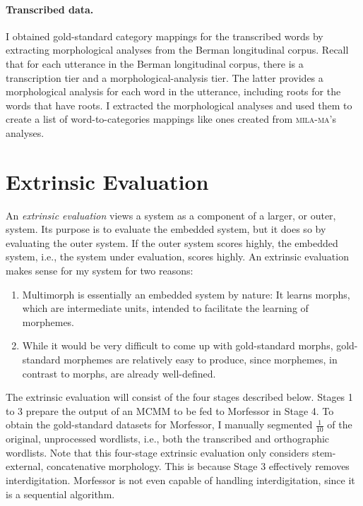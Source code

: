 \paragraph{Transcribed data.} I obtained gold-standard category mappings for the 
transcribed words by extracting morphological analyses from the Berman 
longitudinal corpus. Recall that for each utterance in the Berman longitudinal corpus, 
there is a transcription tier and a morphological-analysis tier. The latter provides a 
morphological analysis for each word in the utterance, including roots for the words 
that have roots. I extracted the morphological analyses and used them to create a list of 
word-to-categories mappings like ones created from \textsc{mila-ma}'s analyses.

\section{Extrinsic Evaluation} \label{sec:eval-extrinsic} An \emph{extrinsic evaluation} 
views a system as a component of a larger, or outer, system. 
Its purpose is to evaluate the embedded system, but it does so by evaluating the outer 
system. If the outer system scores highly,
the embedded system, i.e., the system under evaluation, scores highly.
An extrinsic evaluation makes sense for my system for two reasons:
\begin{enumerate}
\item Multimorph is essentially an embedded system by nature: It learns morphs, which are intermediate units, intended to facilitate the learning of morphemes. %
\item While it would be very difficult to come up with gold-standard morphs, gold-standard morphemes are relatively easy to produce, since morphemes, in contrast to morphs, are already well-defined. 
\end{enumerate}

The extrinsic evaluation will consist of the four stages described below. 
Stages 1 to 3 prepare the output of an MCMM to be fed to Morfessor in Stage 4. 
To obtain the gold-standard datasets for Morfessor, I manually segmented 
$\frac{1}{10}$ of the original, unprocessed wordlists, i.e., both the transcribed 
and orthographic wordlists. Note that this four-stage extrinsic evaluation only considers 
stem-external, concatenative morphology. This is because Stage 3 effectively removes 
interdigitation. Morfessor is not even capable of handling interdigitation, since it is 
a sequential algorithm.

